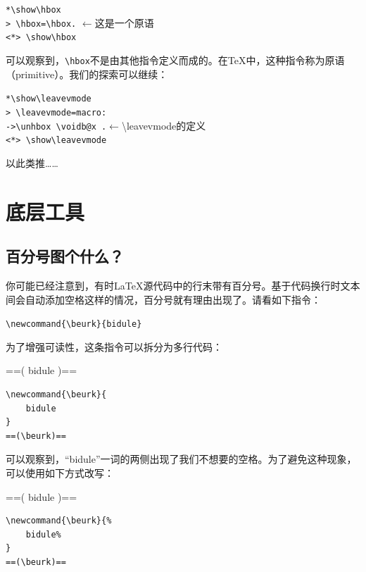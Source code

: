 \begin{dmd}
\verb|*\show\hbox|\\
\verb|> \hbox=\hbox.| \quad $\leftarrow$\textsf{这是一个原语}\\
\verb|<*> \show\hbox|
\end{dmd}

可以观察到，\verb|\hbox|不是由其他指令定义而成的。在\TeX 中，这种指令称为原语（primitive）。我们的探索可以继续：

\begin{dmd}
\verb|*\show\leavevmode|\\
\verb|> \leavevmode=macro:|\\
\verb|->\unhbox \voidb@x .|\quad $\leftarrow$\backslash leavevmode\textsf{的定义}\\
\verb|<*> \show\leavevmode|
\end{dmd}

以此类推……

\section{底层工具}

\subsection{百分号图个什么？}

你可能已经注意到，有时\LaTeX 源代码中的行末带有百分号\dm{\%}。基于代码换行时文本间会自动添加空格这样的情况，百分号就有理由出现了。请看如下指令：

\begin{dmd}
\verb|\newcommand{\beurk}{bidule}|
\end{dmd}

为了增强可读性，这条指令可以拆分为多行代码：

\begin{codelist}[9.1]{
\newcommand{\beurk}{
    bidule
}
==(\beurk)==
}
\begin{verbatim}
\newcommand{\beurk}{
    bidule
}
==(\beurk)==\end{verbatim}
\end{codelist}

可以观察到，“bidule”一词的两侧出现了我们不想要的空格。为了避免这种现象，可以使用如下方式改写：


\begin{codelist}[9.2]{
\newcommand{\beurk}{%
    bidule%
}
==(\beurk)==
}
\begin{verbatim}
\newcommand{\beurk}{%
    bidule%
}
==(\beurk)==\end{verbatim}
\end{codelist}

